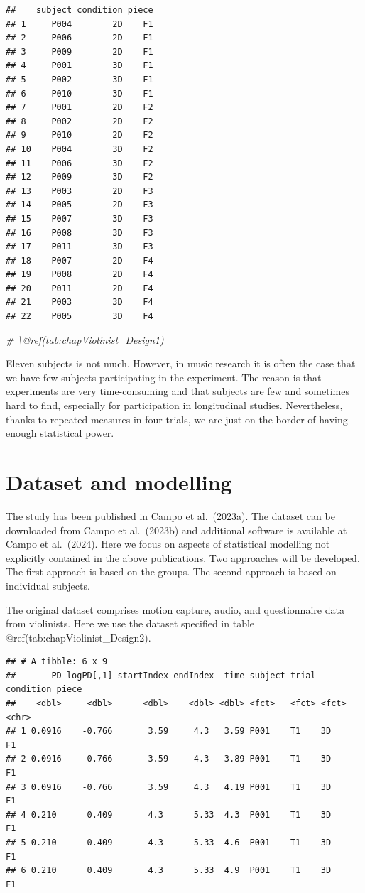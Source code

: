 \documentclass[
]{book}
\newenvironment{Shaded}{\begin{snugshade}}{\end{snugshade}}
\newcommand{\CommentTok}[1]{\textcolor[rgb]{0.56,0.35,0.01}{\textit{#1}}}
\theoremstyle{definition}
\theoremstyle{definition}
\theoremstyle{definition}
\theoremstyle{definition}
\theoremstyle{remark}
\begin{document}
\begin{verbatim}
##    subject condition piece
## 1     P004        2D    F1
## 2     P006        2D    F1
## 3     P009        2D    F1
## 4     P001        3D    F1
## 5     P002        3D    F1
## 6     P010        3D    F1
## 7     P001        2D    F2
## 8     P002        2D    F2
## 9     P010        2D    F2
## 10    P004        3D    F2
## 11    P006        3D    F2
## 12    P009        3D    F2
## 13    P003        2D    F3
## 14    P005        2D    F3
## 15    P007        3D    F3
## 16    P008        3D    F3
## 17    P011        3D    F3
## 18    P007        2D    F4
## 19    P008        2D    F4
## 20    P011        2D    F4
## 21    P003        3D    F4
## 22    P005        3D    F4
\end{verbatim}

\begin{Shaded}
\begin{Highlighting}[]
\CommentTok{\# \textbackslash{}@ref(tab:chapViolinist\_Design1)}
\end{Highlighting}
\end{Shaded}

Eleven subjects is not much. However, in music research it is often the case that we have few subjects participating in the experiment. The reason is that experiments are very time-consuming and that subjects are few and sometimes hard to find, especially for participation in longitudinal studies.
Nevertheless, thanks to repeated measures in four trials, we are just on the border of having enough statistical power.

\hypertarget{dataset-and-modelling}{%
\section{Dataset and modelling}\label{dataset-and-modelling}}

The study has been published in Campo et al.~(2023a). The dataset can be downloaded from Campo et al.~(2023b) and additional software is available at Campo et al.~(2024).
Here we focus on aspects of statistical modelling not explicitly contained in the above publications.
Two approaches will be developed.
The first approach is based on the groups.
The second approach is based on individual subjects.

The original dataset comprises motion capture, audio, and questionnaire data from violinists. Here we use the dataset specified in table @ref(tab:chapViolinist\_Design2).

\begin{verbatim}
## # A tibble: 6 x 9
##       PD logPD[,1] startIndex endIndex  time subject trial condition piece
##    <dbl>     <dbl>      <dbl>    <dbl> <dbl> <fct>   <fct> <fct>     <chr>
## 1 0.0916    -0.766       3.59     4.3   3.59 P001    T1    3D        F1   
## 2 0.0916    -0.766       3.59     4.3   3.89 P001    T1    3D        F1   
## 3 0.0916    -0.766       3.59     4.3   4.19 P001    T1    3D        F1   
## 4 0.210      0.409       4.3      5.33  4.3  P001    T1    3D        F1   
## 5 0.210      0.409       4.3      5.33  4.6  P001    T1    3D        F1   
## 6 0.210      0.409       4.3      5.33  4.9  P001    T1    3D        F1
\end{verbatim}
\end{document}
